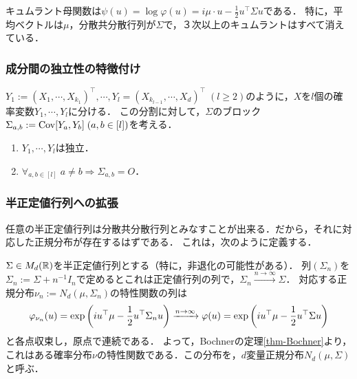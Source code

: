 \documentclass[uplatex,dvipdfmx]{jsreport}
\begin{document}
\begin{corollary}
    キュムラント母関数は$\psi(u)=\log\varphi(u)=i\mu\cdot u-\frac{1}{2}u^\top\Sigma u$である．
    特に，平均ベクトルは$\mu$，分散共分散行列が$\Sigma$で，３次以上のキュムラントはすべて消えている．
\end{corollary}

\subsubsection{成分間の独立性の特徴付け}

\begin{proposition}[多次元正規確率変数の成分間の独立性]
    $Y_1:=(X_1,\cdots,X_{k_1})^\top,\cdots,Y_l=(X_{k_{l-1}},\cdots,X_d)^\top\;(l\ge 2)$のように，$X$を$l$個の確率変数$Y_1,\cdots,Y_l$に分ける．
    この分割に対して，$\Sigma$のブロック$\Sigma_{a,b}:=\mathrm{Cov}[Y_a,Y_b]\;(a,b\in[l])$を考える．
    \begin{enumerate}
        \item $Y_1,\cdots,Y_l$は独立．
        \item $\forall_{a,b\in[l]}\;a\ne b\Rightarrow\Sigma_{a,b}=O$．
    \end{enumerate}
\end{proposition}

\subsubsection{半正定値行列への拡張}

\begin{tcolorbox}[colframe=ForestGreen, colback=ForestGreen!10!white,breakable,colbacktitle=ForestGreen!40!white,coltitle=black,fonttitle=\bfseries\sffamily,
title=]
    任意の半正定値行列は分散共分散行列とみなすことが出来る．だから，それに対応した正規分布が存在するはずである．
    これは，次のように定義する．
\end{tcolorbox}

\begin{definition}
    $\Sigma\in M_d(\mathbb{R})$を半正定値行列とする（特に，非退化の可能性がある）．
    列$(\Sigma_n)$を$\Sigma_n:=\Sigma+n^{-1}I_n$で定めるとこれは正定値行列の列で，$\Sigma_n\xrightarrow{n\to\infty}\Sigma$．
    対応する正規分布$\nu_n:=N_d(\mu,\Sigma_n)$の特性関数の列は
    \[\varphi_{\nu_n}(u)=\exp\left(iu^\top\mu-\frac{1}{2}u^\top\Sigma_nu\right)\xrightarrow{n\to\infty}\varphi(u)=\exp\left(iu^\top\mu-\frac{1}{2}u^\top\Sigma u\right)\]
    と各点収束し，原点で連続である．
    よって，Bochnerの定理\ref{thm-Bochner}より，これはある確率分布$\nu$の特性関数である．この分布を，$d$変量正規分布$N_d(\mu,\Sigma)$と呼ぶ．
\end{definition}
\end{document}
